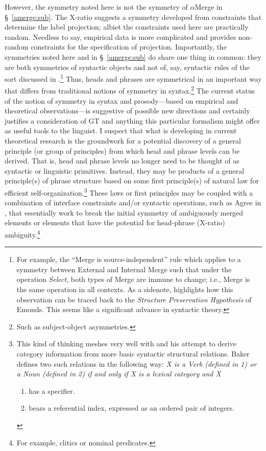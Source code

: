 \documentclass[11pt,twoside]{article}
\theoremstyle{plain}
\numberwithin{equation}{section}
\theoremstyle{definition}
\newtheorem{phrase string}{Phrase String}
\begin{document}
However, the symmetry noted here is not the symmetry of $\alpha$Merge in \S~\ref{amerge:sub}. The X-ratio suggests a symmetry developed from constraints that determine the label projection; albiet the constraints used here are practically random. Needless to say, empirical data is more complicated and provides non-random constraints for the specification of projection. Importantly, the symmetries noted here and in \S~\ref{amerge:sub} do share one thing in common: they are both symmetries of syntactic objects and not of, say, syntactic rules of the sort discussed in \cite{boeckx08bare}.\footnote{For example, the ``Merge is source-independent'' rule which applies to a symmetry between External and Internal Merge such that under the operation \textsl{Select}, both types of Merge are immune to change; i.e., Merge is the same operation in all contexts. As a sidenote, \cite{boeckx08bare} highlights how this observation can be traced back to the \textsl{Structure Preservation Hypothesis} of Emonds. This seems like a significant advance in syntactic theory.} Thus, heads and phrases are symmetrical in an important way that differs from traditional notions of symmetry in syntax.\footnote{Such as subject-object asymmetries.} The current status of the notion of symmetry in syntax and prosody---based on empirical and theoretical observations---is suggestive of possible new directions and certainly justifies a consideration of GT and anything this particular formalism might offer as useful tools to the linguist. I suspect that what is developing in  current theoretical research is the groundwork for a potential discovery of a general principle (or group of principles) from which head and phrase levels can be derived. That is, head and phrase levels no longer need to be thought of as syntactic or linguistic primitives. Instead, they may be products of a general principle(s) of phrase structure based on some first principle(s) of natural law for efficient self-organization.\footnote{This kind of thinking meshes very well with \cite{baker:2003} and his attempt to derive category information from more basic syntactic structural relations. Baker defines two such relations in the following way: \textsl{X is a Verb (defined in 1) or a Noun (defined in 2) if and only if X is a lexical category and X} \begin{enumerate}\item has a specifier. \item bears a referential index, expressed as an ordered pair of integers.\end{enumerate}} These laws or first principles may be coupled with a combination of interface constraints and/or syntactic operations, such as Agree in \cite{boeckx08bare}, that essentially work to break the initial symmetry of ambiguously merged elements or elements that have the potential for head-phrase (X-ratio) ambiguity.\footnote{For example, clitics or nominal predicates.}
\end{document}
